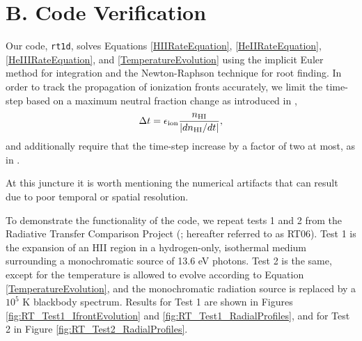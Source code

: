 \documentclass[preprint2]{aastex}              %
\begin{document}
\section{B. Code Verification}
Our code, \texttt{rt1d}, solves Equations \ref{HIIRateEquation}, \ref{HeIIRateEquation}, \ref{HeIIIRateEquation}, and \ref{TemperatureEvolution} using the implicit Euler method for integration and the Newton-Raphson technique for root finding.  In order to track the propagation of ionization fronts accurately, we limit the time-step based on a maximum neutral fraction change as introduced in \cite{Shapiro2004},
\begin{equation}
    \Delta t = \epsilon_{\mathrm{ion}} \frac{n_{\text{HI}}}{|dn_{\text{HI}}/dt|} ,
\end{equation}
and additionally require that the time-step increase by a factor of two at most, as in \cite{Wise2011}.

At this juncture it is worth mentioning the numerical artifacts that can result due to poor temporal or spatial resolution.  

To demonstrate the functionality of the code, we repeat tests 1 and 2 from the Radiative Transfer Comparison Project (\cite{Iliev2006}; hereafter referred to as RT06).  Test 1 is the expansion of an HII region in a hydrogen-only, isothermal medium surrounding a monochromatic source of 13.6 eV photons.  Test 2 is the same, except for the temperature is allowed to evolve according to Equation \ref{TemperatureEvolution}, and the monochromatic radiation source is replaced by a $10^5$ K blackbody spectrum.  Results for Test 1 are shown in Figures \ref{fig:RT_Test1_IfrontEvolution} and \ref{fig:RT_Test1_RadialProfiles}, and for Test 2 in Figure \ref{fig:RT_Test2_RadialProfiles}.
\begin{figure*}
\begin{center}
\leavevmode
{}
\vspace{-20pt}
\caption[]{\textit{Top:} Comparison of the calculated (dashed) and analytic (solid) positions of an expanding ionization front in a hydrogen-only, isothermal medium. \textit{Bottom:} Ratio of the calculated and analytic solutions.}
\label{fig:RT_Test1_IfrontEvolution}
\end{center}
\end{figure*}

\begin{figure*}
\begin{center}
\leavevmode
{}
\vspace{-20pt}
\caption[]{Radial profiles of the neutral (solid) and ionized (dashed) fractions at $t = 10$, $30$, $100$, and $500$ Myr.}
\label{fig:RT_Test1_RadialProfiles}
\end{center}
\end{figure*}
\end{document}
